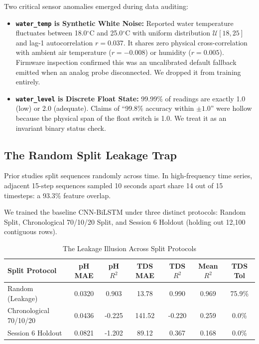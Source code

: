 \documentclass[conference]{IEEEtran}
\begin{document}
Two critical sensor anomalies emerged during data auditing:
\begin{itemize}
    \item \textbf{\texttt{water\_temp} is Synthetic White Noise:} Reported water temperature fluctuates between 18.0$^\circ\mathrm{C}$ and 25.0$^\circ\mathrm{C}$ with uniform distribution $\mathcal{U}[18, 25]$ and lag-1 autocorrelation $r = 0.037$. It shares zero physical cross-correlation with ambient air temperature ($r = -0.008$) or humidity ($r = 0.005$). Firmware inspection confirmed this was an uncalibrated default fallback emitted when an analog probe disconnected. We dropped it from training entirely.
    \item \textbf{\texttt{water\_level} is Discrete Float State:} 99.99\% of readings are exactly 1.0 (low) or 2.0 (adequate). Claims of ``99.8\% accuracy within $\pm 1.0$'' were hollow because the physical span of the float switch is 1.0. We treat it as an invariant binary status check.
\end{itemize}

\subsection{The Random Split Leakage Trap}
Prior studies split sequences randomly across time. In high-frequency time series, adjacent 15-step sequences sampled 10 seconds apart share 14 out of 15 timesteps: a 93.3\% feature overlap.

We trained the baseline CNN-BiLSTM under three distinct protocols: Random Split, Chronological 70/10/20 Split, and Session 6 Holdout (holding out 12,100 contiguous rows).

\begin{table}[htbp]
\caption{The Leakage Illusion Across Split Protocols}
\label{tab:leakage}
\centering
\footnotesize
\setlength{\tabcolsep}{3.2pt}
\begin{tabular}{lcccccc}
\toprule
\textbf{Split Protocol} & \textbf{pH MAE} & \textbf{pH $R^2$} & \textbf{TDS MAE} & \textbf{TDS $R^2$} & \textbf{Mean $R^2$} & \textbf{TDS Tol} \\
\midrule
Random (Leakage)       & 0.0320 &  0.903 &  13.78 &  0.990 &  0.969 & 75.9\% \\
Chronological 70/10/20 & 0.0436 & -0.225 & 141.52 & -0.220 &  0.259 &  0.0\% \\
Session 6 Holdout      & 0.0821 & -1.202 &  89.12 &  0.367 &  0.168 &  0.0\% \\
\bottomrule
\end{tabular}
\end{table}
\end{document}
